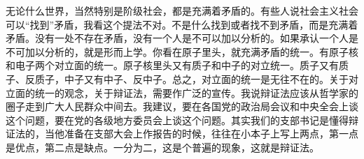 无论什么世界，当然特别是阶级社会，都是充满着矛盾的。有些人说社会主义社会可以“找到”矛盾，我看这个提法不对。不是什么找到或者找不到矛盾，而是充满着矛盾。没有一处不存在矛盾，没有一个人是不可以加以分析的。如果承认一个人是不可加以分析的，就是形而上学。你看在原子里头，就充满矛盾的统一。有原子核和电子两个对立面的统一。原子核里头又有质子和中子的对立统一。质子又有质子、反质子，中子又有中子、反中子。总之，对立面的统一是无往不在的。关于对立面的统一的观念，关于辩证法，需要作广泛的宣传。我说辩证法应该从哲学家的圈子走到广大人民群众中间去。我建议，要在各国党的政治局会议和中央全会上谈这个问题，要在党的各级地方委员会上谈这个问题。其实我们的支部书记是懂得辩证法的，当他准备在支部大会上作报告的时候，往往在小本子上写上两点，第一点是优点，第二点是缺点。一分为二，这是个普遍的现象，这就是辩证法。
